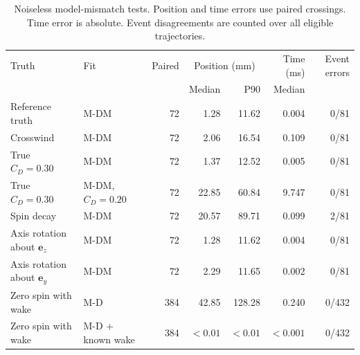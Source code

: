 \begin{table}[!htbp]
\centering
\caption{Noiseless model-mismatch tests. Position and time errors use paired crossings. Time error is absolute. Event disagreements are counted over all eligible trajectories.}
\label{tab:part6-v3}
\scriptsize
\setlength{\tabcolsep}{2.25pt}
\begin{tabular}{@{}llrrrrr@{}}
\toprule
Truth & Fit & Paired & \multicolumn{2}{c}{Position (mm)} & \shortstack{Time\\(ms)} & Event errors \\
\cmidrule(lr){4-5}
 & & & Median & P90 & Median & \\
\midrule
Reference truth & M-DM & 72 & 1.28 & 11.62 & 0.004 & 0/81 \\
Crosswind & M-DM & 72 & 2.06 & 16.54 & 0.109 & 0/81 \\
True \(C_D=0.30\) & M-DM & 72 & 1.37 & 12.52 & 0.005 & 0/81 \\
True \(C_D=0.30\) & M-DM, \(C_D=0.20\) & 72 & 22.85 & 60.84 & 9.747 & 0/81 \\
Spin decay & M-DM & 72 & 20.57 & 89.71 & 0.099 & 2/81 \\
Axis rotation about \(\mathbf e_z\) & M-DM & 72 & 1.28 & 11.62 & 0.004 & 0/81 \\
Axis rotation about \(\mathbf e_y\) & M-DM & 72 & 2.29 & 11.65 & 0.002 & 0/81 \\
Zero spin with wake & M-D & 384 & 42.85 & 128.28 & 0.240 & 0/432 \\
Zero spin with wake & M-D + known wake & 384 & \(<0.01\) & \(<0.01\) & \(<0.001\) & 0/432 \\
\bottomrule
\end{tabular}
\end{table}
